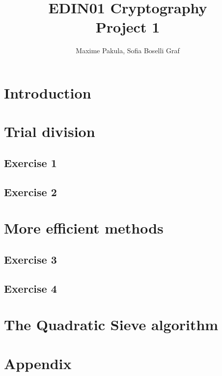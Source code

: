 \documentclass{article}
\title{EDIN01 Cryptography \\ Project 1}
\author{Maxime Pakula, Sofia Boselli Graf}
\begin{document}
\maketitle

\tableofcontents

\newpage

\section{Introduction}

\section{Trial division}

\subsection{Exercise 1}

\subsection{Exercise 2}

\section{More efficient methods}

\subsection{Exercise 3}

\subsection{Exercise 4}

\section{The Quadratic Sieve algorithm}

\section{Appendix}
\end{document}

